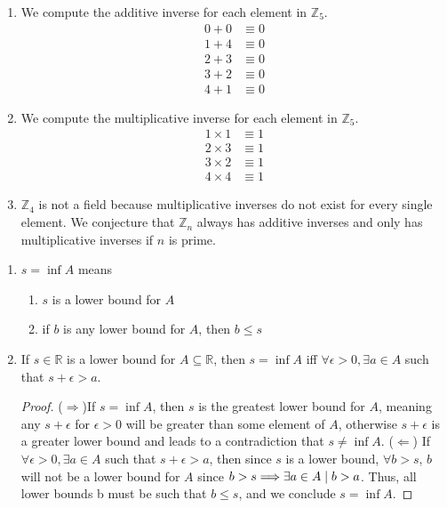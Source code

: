 \setcounter{section}{3}
\setcounter{exercise}{0}

\begin{exercise}
\begin{enumerate}[label=(\alph*)]
	\item We compute the additive inverse for each element in $\mathbb{Z}_5$. 
	\begin{align*}
		0 + 0 &\equiv 0 \\
		1 + 4 &\equiv 0 \\
		2 + 3 &\equiv 0 \\
		3 + 2 &\equiv 0 \\
		4 + 1 &\equiv 0
	\end{align*}
	\item We compute the multiplicative inverse for each element in $\mathbb{Z}_5$. 
	\begin{align*}
		1 \times 1 &\equiv 1 \\
		2 \times 3 &\equiv 1 \\
		3 \times 2 &\equiv 1 \\
		4 \times 4 &\equiv 1
	\end{align*}
	\item $\mathbb{Z}_4$ is not a field because multiplicative inverses do not exist for every single element. We conjecture that $\mathbb{Z}_n$ always has additive inverses and only has multiplicative inverses if $n$ is prime.
\end{enumerate}
\end{exercise}

\begin{exercise}
\begin{enumerate}[label=(\alph*)]
	\item  $s = \inf A$ means 
	\begin{enumerate}[label=\roman*)]
		\item $s$ is a lower bound for $A$
		\item if $b$ is any lower bound for $A$, then $b \leq s$
	\end{enumerate}
	\item If $s\in \mathbb{R}$ is a lower bound for $A \subseteq \mathbb{R}$, then $s=\inf A$ iff $\forall \epsilon > 0, \exists a \in A$ such that $s + \epsilon > a$.
	\begin{proof}
		($\Rightarrow$)If $s=\inf A$, then $s$ is the greatest lower bound for $A$, meaning any $s+ \epsilon$ for $\epsilon > 0$ will be greater than some element of $A$, otherwise $s+ \epsilon$ is a greater lower bound and leads to a contradiction that $s \neq \inf A$.
		($\Leftarrow$) If $\forall \epsilon > 0, \exists a \in A$ such that $s+\epsilon > a$, then since $s$ is a lower bound, $\forall b > s$, $b$ will not be a lower bound for $A$ since $b > s \Longrightarrow \exists a \in A \mid b > a$. Thus, all lower bounds b must be such that $b \leq s$, and we conclude $s = \inf A$.
	\end{proof}
\end{enumerate}
\end{exercise}

